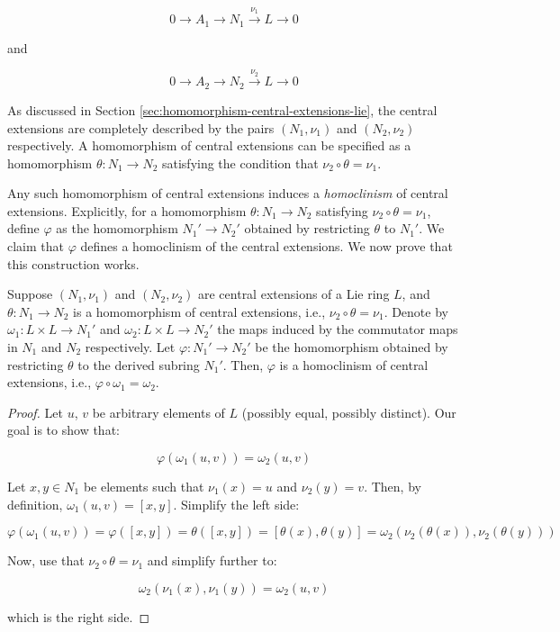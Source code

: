 $$0 \to A_1 \to N_1 \stackrel{\nu_1}{\to} L \to 0$$

and

$$0 \to A_2 \to N_2 \stackrel{\nu_2}{\to} L \to 0$$

As discussed in Section \ref{sec:homomorphism-central-extensions-lie}, the
central extensions are completely described by the pairs $(N_1,\nu_1)$
and $(N_2,\nu_2)$ respectively. A homomorphism of central extensions
can be specified as a homomorphism $\theta:N_1 \to N_2$ satisfying the
condition that $\nu_2 \circ \theta = \nu_1$.

Any such homomorphism of central extensions induces a {\em
  homoclinism} of central extensions. Explicitly, for a homomorphism
$\theta: N_1 \to N_2$ satisfying $\nu_2 \circ \theta = \nu_1$, define
$\varphi$ as the homomorphism $N_1' \to N_2'$ obtained by restricting
$\theta$ to $N_1'$. We claim that $\varphi$ defines a homoclinism of
the central extensions. We now prove that this construction works.

\begin{lemma}\label{lemma:homomorphism-restriction-homoclinism-lie}
  Suppose $(N_1,\nu_1)$ and $(N_2,\nu_2)$ are central extensions of a
  Lie ring $L$, and $\theta:N_1 \to N_2$ is a homomorphism of central
  extensions, i.e., $\nu_2 \circ \theta = \nu_1$. Denote by $\omega_1:
  L \times L \to N_1'$ and $\omega_2: L \times L \to N_2'$ the maps
  induced by the commutator maps in $N_1$ and $N_2$ respectively. Let
  $\varphi:N_1' \to N_2'$ be the homomorphism obtained by restricting
  $\theta$ to the derived subring $N_1'$. Then, $\varphi$ is a
  homoclinism of central extensions, i.e., $\varphi \circ \omega_1 =
  \omega_2$.
\end{lemma}

\begin{proof}
  Let $u$, $v$ be arbitrary elements of $L$ (possibly equal, possibly
  distinct). Our goal is to show that:

  $$\varphi(\omega_1(u,v)) = \omega_2(u,v)$$

  Let $x, y \in N_1$ be elements such that $\nu_1(x) = u$ and
  $\nu_2(y) = v$. Then, by definition, $\omega_1(u,v) =
  [x,y]$. Simplify the left side:

  $$\varphi(\omega_1(u,v)) = \varphi([x,y]) = \theta([x,y]) = [\theta(x),\theta(y)] = \omega_2(\nu_2(\theta(x)),\nu_2(\theta(y)))$$

  Now, use that $\nu_2 \circ \theta = \nu_1$ and simplify further to:

  $$\omega_2(\nu_1(x),\nu_1(y)) = \omega_2(u,v)$$

  which is the right side.
\end{proof}

